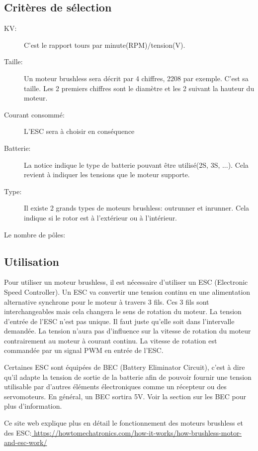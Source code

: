 \documentclass[a4paper, 11pt]{report}
\begin{document}
\subsection{Critères de sélection}
\begin{description}
\item[KV:]C'est le rapport tours par minute(RPM)/tension(V). 
\item[Taille:] Un moteur brushless sera décrit par 4 chiffres, 2208 par exemple. C'est sa taille. Les 2 premiers chiffres sont le diamètre et les 2 suivant la hauteur du moteur.
\item[Courant consommé:] L'ESC sera à choisir en conséquence
\item[Batterie:]La notice indique le type de batterie pouvant être utilisé(2S, 3S, ...). Cela revient à indiquer les tensions que le moteur supporte.
\item[Type:]Il existe 2 grands types de moteurs brushless: outrunner et inrunner. Cela indique si le rotor est à l'extérieur ou à l'intérieur.
\item[Le nombre de pôles:]
\end{description}


\subsection{Utilisation}
Pour utiliser un moteur brushless, il est nécessaire d'utiliser un  ESC (Electronic Speed Controller). Un ESC va convertir une tension continu en une alimentation alternative synchrone pour le moteur à travers 3 fils. Ces 3 fils sont interchangeables mais cela changera le sens de rotation du moteur. La tension d'entrée de l'ESC n'est pas unique. Il faut juste qu'elle soit dans l'intervalle demandée. La tension n'aura pas d'influence sur la vitesse de rotation du moteur contrairement au moteur à courant continu. La vitesse de rotation est commandée par un signal PWM en entrée de l'ESC.

Certaines ESC sont équipées de BEC (Battery Eliminator Circuit), c'est à dire qu'il adapte la tension de sortie de la batterie afin de pouvoir fournir une tension utilisable par d'autres éléments électroniques comme un récepteur ou des servomoteurs. En général, un BEC sortira 5V. Voir la section sur les BEC pour plus d'information.

Ce site web explique plus en détail le fonctionnement des moteurs brushless et des ESC:\url{ https://howtomechatronics.com/how-it-works/how-brushless-motor-and-esc-work/}
\end{document}
